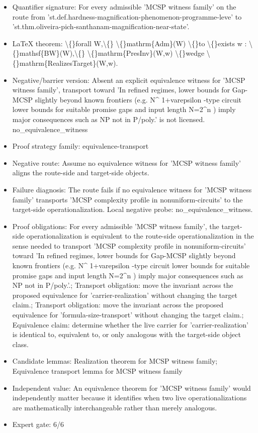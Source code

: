\documentclass[11pt]{article}
\begin{document}
\begin{itemize}
\item Quantifier signature: For every admissible 'MCSP witness family' on the route from 'st.def.hardness-magnification-phenomenon-programme-leve' to 'st.thm.oliveira-pich-santhanam-magnification-near-state'.
\item LaTeX theorem: \textbackslash\{\}forall W,\textbackslash\{\} \textbackslash\{\}mathrm\{Adm\}(W) \textbackslash\{\}to \textbackslash\{\}exists w : \textbackslash\{\}mathsf\{BW\}(W),\textbackslash\{\} \textbackslash\{\}mathrm\{PresInv\}(W,w) \textbackslash\{\}wedge \textbackslash\{\}mathrm\{RealizesTarget\}(W,w).
\item Negative/barrier version: Absent an explicit equivalence witness for 'MCSP witness family', transport toward 'In refined regimes, lower bounds for Gap-MCSP slightly beyond known frontiers (e.g. N\textasciicircum{} 1+varepsilon -type circuit lower bounds for suitable promise gaps and input length N=2\textasciicircum{}n ) imply major consequences such as NP not in P/poly.' is not licensed. no\_equivalence\_witness
\item Proof strategy family: equivalence-transport
\item Negative route: Assume no equivalence witness for 'MCSP witness family' aligns the route-side and target-side objects.
\item Failure diagnosis: The route fails if no equivalence witness for 'MCSP witness family' transports 'MCSP complexity profile in nonuniform-circuits' to the target-side operationalization. Local negative probe: no\_equivalence\_witness.
\item Proof obligations: For every admissible 'MCSP witness family', the target-side operationalization is equivalent to the route-side operationalization in the sense needed to transport 'MCSP complexity profile in nonuniform-circuits' toward 'In refined regimes, lower bounds for Gap-MCSP slightly beyond known frontiers (e.g. N\textasciicircum{} 1+varepsilon -type circuit lower bounds for suitable promise gaps and input length N=2\textasciicircum{}n ) imply major consequences such as NP not in P/poly.'.; Transport obligation: move the invariant across the proposed equivalence for 'carrier-realization' without changing the target claim.; Transport obligation: move the invariant across the proposed equivalence for 'formula-size-transport' without changing the target claim.; Equivalence claim: determine whether the live carrier for 'carrier-realization' is identical to, equivalent to, or only analogous with the target-side object class.
\item Candidate lemmas: Realization theorem for MCSP witness family; Equivalence transport lemma for MCSP witness family
\item Independent value: An equivalence theorem for 'MCSP witness family' would independently matter because it identifies when two live operationalizations are mathematically interchangeable rather than merely analogous.
\item Expert gate: 6/6
\end{itemize}
\end{document}
